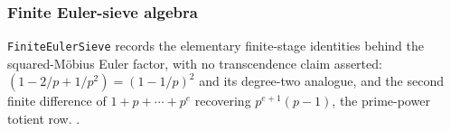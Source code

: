 \subsubsection{Finite Euler-sieve algebra}

\texttt{FiniteEulerSieve} records the elementary finite-stage identities
behind the squared-Möbius Euler factor, with no transcendence claim
asserted: $(1-2/p+1/p^2) = (1-1/p)^2$ and its degree-two analogue, and the
second finite difference of $1+p+\cdots+p^{e}$ recovering
$p^{e+1}(p-1)$, the prime-power totient row.
\quad {}
\quad {} \quad {} \quad {}.

